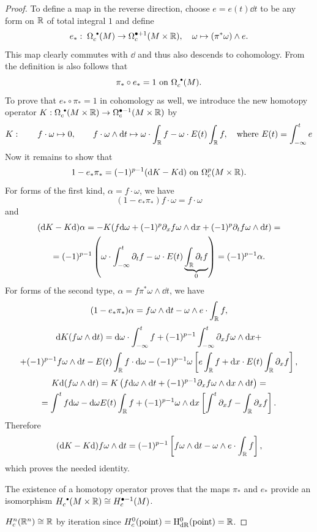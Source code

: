 \begin{proof}
    To define a map in the reverse direction, choose $e=e(t)\dd t$ to be any form on $\mathbb{R}$ of total integral $1$ and define
    \[e_\ast: \; \Omega_c^{\smbullet }(M)\to \Omega_c^{\bullet+1}(M\times\bbR),\quad \omega\mapsto (\pi^\ast \omega)\wedge e.\]
    This map clearly commutes with $\dd$ and thus also descends to cohomology. From the definition is also follows that 
    \[\pi_\ast\circ e_\ast=1 \text{ on }\Omega_c^{\smbullet }(M).\]
    To prove that $e_\ast\circ \pi_\ast=1$ in cohomology as well, we introduce the new homotopy operator $K:\Omega_c^{\smbullet }(M\times\bbR)\to \Omega_c^{\bullet-1}(M\times \bbR)$ by
    \begin{equation}
        K: \quad\quad f\cdot\omega\mapsto 0,    \quad\quad f\cdot \omega\wedge{\mathrm{d}} t\mapsto  \omega\cdot\int_{\mathbb{R}} f-\omega\cdot E(t)\int_{\mathbb{R}} f,\quad \text{where } E(t)=\int_{-\infty}^t e
    \end{equation}
    Now it remains to show that 
    \[1-e_\ast\pi_\ast=(-1)^{p-1}({\mathrm{d}} K-K{\mathrm{d}})\text{ on }\Omega_c^p(M\times\mathbb{R}).\]
    For forms of the first kind, $\alpha=f\cdot\omega$, we have
    \[(1-e_\ast\pi_\ast)f\cdot\omega=f\cdot\omega\]
    and
    \begin{multline}
        ({\mathrm{d}} K-K {\mathrm{d}})\alpha=-K(f{\mathrm{d}}\omega+(-1)^p\partial_x f \omega\wedge{\mathrm{d}} x+(-1)^p \partial_t f \omega\wedge{\mathrm{d}} t)
        =\\=(-1)^{p-1}\left(\omega\cdot \int_{-\infty}^t \partial_t f-\omega\cdot E(t) \underbrace{\int_{\mathbb{R}} \partial_t f}_0\right)=(-1)^{p-1}\alpha.
    \end{multline}
    For forms of the second type, $\alpha=f\pi^\ast \omega \wedge \dd t$, we have
    \[(1-e_\ast\pi_\ast)\alpha=f\omega\wedge{\mathrm{d}} t- \omega\wedge e\cdot \int_{\mathbb{R}} f,\]
    \begin{multline}
        {\mathrm{d}} K(f\omega\wedge{\mathrm{d}} t)={\mathrm{d}}\omega\cdot \int_{-\infty}^t f+(-1)^{p-1}\int_{-\infty}^t \partial_x f\omega \wedge {\mathrm{d}} x+\\+(-1)^{p-1}f\omega\wedge{\mathrm{d}} t-E(t)\int_{\mathbb{R}} f\cdot {\mathrm{d}}\omega-(-1)^{p-1}\omega \left[e\int_{\mathbb{R}} f+{\mathrm{d}} x\cdot E(t)\int_{\mathbb{R}} \partial_x f\right],
    \end{multline}
    \begin{multline}
        K{\mathrm{d}} (f\omega\wedge{\mathrm{d}} t)=K\left(f{\mathrm{d}} \omega\wedge{\mathrm{d}} t+(-1)^{p-1}\partial_x f \omega\wedge{\mathrm{d}} x\wedge{\mathrm{d}} t\right)=\\=\int^t f{\mathrm{d}}\omega-{\mathrm{d}}\omega E(t)\int_{\mathbb{R}} f+(-1)^{p-1}\omega\wedge{\mathrm{d}} x\left[ \int^t\partial_x f- \int_{\mathbb{R}} \partial_x f\right].
    \end{multline}
    Therefore
    \[({\mathrm{d}} K-K {\mathrm{d}} )f\omega\wedge{\mathrm{d}} t=(-1)^{p-1}\left[f\omega\wedge{\mathrm{d}} t -\omega\wedge e\cdot\int_{\mathbb{R}} f\right],\]
    which proves the needed identity.
    
    The existence of a homotopy operator proves that the maps $\pi_\ast$ and $e_\ast$ provide an isomorphism
    $H_c^{\smbullet }(M\times\bbR)\cong H_c^{\bullet -1}(M)$.
    
    $H_c^n(\mathbb{R}^n)\cong \mathbb{R}$ by iteration since $H_c^0(\text{point})=\mathrm{H}_{\rm dR}^0(\text{point})=\mathbb{R}$.
\end{proof}
